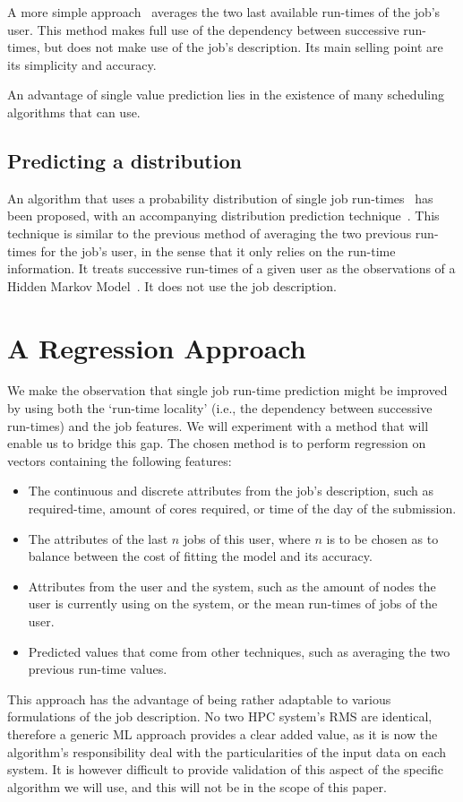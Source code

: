 \documentclass{article}
\begin{document}
  A more simple approach~\cite{tsafir} averages the two last available run-times of the job's user.
  This method makes full use of the dependency between successive run-times, but does not make use of the job's description. Its main selling point are its simplicity and accuracy.

  An advantage of single value prediction lies in the existence of many scheduling algorithms that can use.


  \subsection{Predicting a distribution}
  \label{sub:predicting_a_distribution}

  An algorithm that uses a probability distribution of single job run-times~\cite{probabilistic-backfilling} has been proposed, with an accompanying distribution prediction technique~\cite{hmm}. This technique is similar to the previous method of averaging the two previous run-times for the job's user, in the sense that it only relies on the run-time information. It treats successive run-times of a given user as the observations of a Hidden Markov Model~\cite{rabiner}. It does not use the job description.

  \section{A Regression Approach}
  \label{sec:our_approach}
  We make the observation that single job run-time prediction might be improved by using both the `run-time locality' (i.e., the dependency between successive run-times) and the job features. We will experiment with a method that will enable us to bridge this gap.
  The chosen method is to perform regression on vectors containing the following features:
  \begin{itemize}
    \item The continuous and discrete attributes from the job's description, such as required-time, amount of cores required, or time of the day of the submission.
    \item The attributes of the last $n$ jobs of this user, where $n$ is to be chosen as to balance between the cost of fitting the model and its accuracy.
    \item Attributes from the user and the system, such as the amount of nodes the user is currently using on the system, or the mean run-times of jobs of the user.
    \item Predicted values that come from other techniques, such as averaging the two previous run-time values.
  \end{itemize}
  This approach has the advantage of being rather adaptable to various formulations of the job description.
  No two HPC system's RMS are identical, therefore a generic ML approach provides a clear added value, as it is now the algorithm's responsibility deal with the particularities of the input data on each system.
  It is however difficult to provide validation of this aspect of the specific algorithm we will use, and this will not be in the scope of this paper.
\end{document}
